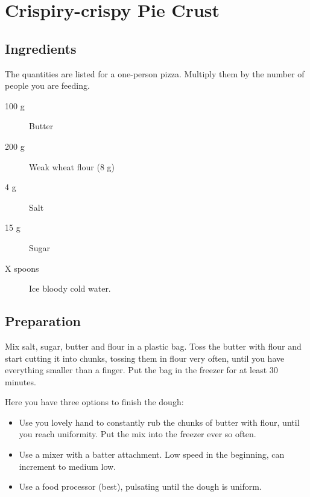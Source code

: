 \setchapterpreamble[u]{\margintoc}
\chapter{Crispiry-crispy Pie Crust}

\section{Ingredients}
The quantities are listed for a one-person pizza. Multiply them by the number of people you are feeding.

\begin{multicols}{2}
\begin{description}
	\item[100 g] Butter
	\item[200 g] Weak wheat flour (8 g)
	\item[4 g] Salt
	\item[15 g] Sugar
	\item[X spoons] Ice bloody cold water.
\end{description}
\end{multicols}

\section{Preparation}
Mix salt, sugar, butter and flour in a plastic bag.
%
Toss the butter with flour and start cutting it into chunks, tossing them in flour very often, until you have everything smaller than a finger.
%
Put the bag in the freezer for at least $30$ minutes.

Here you have three options to finish the dough:
\begin{itemize}
	\item Use you lovely hand to constantly rub the chunks of butter with flour, until you reach uniformity. Put the mix into the freezer ever so often.
	\item Use a mixer with a batter attachment. Low speed in the beginning, can increment to medium low.
	\item Use a food processor (best), pulsating until the dough is uniform.
\end{itemize}


